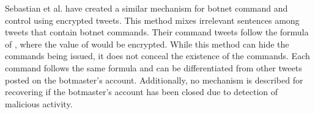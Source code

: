 Sebastian et al. \cite{graybot} have created a similar mechanism for botnet command and control
using encrypted tweets.  This method mixes irrelevant sentences among tweets
that contain botnet commands.  Their command tweets follow the formula of
, where the value of  would be encrypted.
While this method can hide the commands being issued, it does not conceal the
existence of the commands.  Each command follows the same formula and can be
differentiated from other tweets posted on the botmaster's account.  Additionally,
no mechanism is described for recovering if the botmaster's account has been
closed due to detection of malicious activity. 
